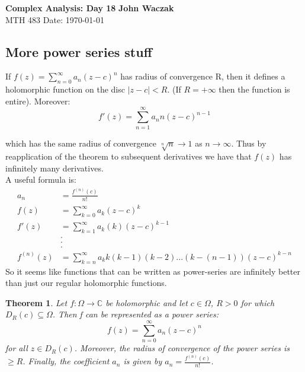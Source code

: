 \documentclass[a4paper, 11pt]{article}
\newtheorem*{theorem}{Theorem}
\begin{document}
\noindent
\large\textbf{Complex Analysis: Day 18} \hfill \textbf{John Waczak} \\
\normalsize MTH 483 \hfill  Date: \today \\

\subsection*{More power series stuff} 
	If $f(z)=\sum\limits_{n=0}^{\infty} a_n(z-c)^n$ has radius of convergence R, then it defines a holomorphic function on the disc $|z-c|<R$. (If $R=+\infty$ then the function is entire). Moreover:
		\begin{equation*}
			f'(z) = \sum\limits_{n=1}^\infty a_n n (z-c)^{n-1}
		\end{equation*}
	
	\noindent which has the same radius of convergence $\sqrt[n]{n}\rightarrow 1$ as $n\rightarrow \infty$. Thus  by reapplication of the theorem to subsequent derivatives we have that $f(z)$ has infinitely many derivatives. \\
	
	\noindent A useful formula is:
		\begin{align*}
			a_n &= \frac{f^{(n)}(c)}{n!} \\ 
			f(z) &= \sum\limits_{k=0}^{\infty} a_k(z-c)^k \\ 
			f'(z) &= \sum\limits_{k=1}^{\infty} a_k(k)(z-c)^{k-1} \\
			 &. \\ 
			 &. \\ 
			 &. \\ 
			f^{(n)}(z) &= \sum\limits_{k=n}^\infty a_k k(k-1)(k-2)...(k-(n-1))(z-c)^{k-n}
		\end{align*}
	\noindent So it seems like functions that can be written as power-series are infinitely better than just our regular holomorphic functions. \\ 
	
	\begin{theorem}
		Let $f:\Omega\rightarrow\mathbb{C}$ be holomorphic and let $c\in\Omega$, $R>0$ for which $D_R(c)\subseteq\Omega$. Then f can be represented as a power series:
			\begin{equation*}
				f(z) = \sum\limits_{n=0}^{\infty} a_n(z-c)^n 
			\end{equation*}
		for all $z\in D_R(c)$. Moreover, the radius of convergence of the power series is $\geq R$. Finally, the coefficient $a_n$ is given by $a_n = \frac{f^{(n)}(c)}{n!}$. 
	\end{theorem}
	
\end{document}
